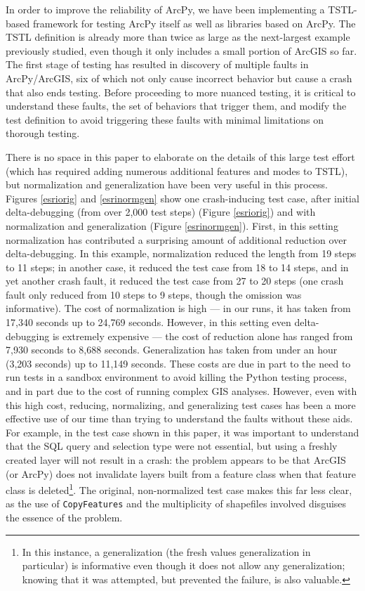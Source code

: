 In order to improve the reliability of ArcPy, we have been
implementing a TSTL-based framework for testing ArcPy itself as well
as libraries based on ArcPy.  The TSTL definition is already more than
twice as large as the next-largest example previously studied, even
though it only includes a small portion of ArcGIS so far. The first
stage of testing has resulted in discovery of multiple faults in
ArcPy/ArcGIS, six of which not only cause incorrect behavior but
cause a crash that also ends testing.  Before proceeding to more
nuanced testing, it is critical to understand these faults, the set of
behaviors that trigger them, and modify the test definition to avoid
triggering these faults with minimal limitations on thorough testing.

There is no space in this paper to elaborate on the details of this
large test effort (which has required adding numerous additional
features and modes to TSTL), but normalization and generalization have
been very useful in this process.  Figures \ref{esriorig} and
\ref{esrinormgen} show one crash-inducing test case, after initial
delta-debugging (from over 2,000 test steps) (Figure \ref{esriorig})
and with normalization and generalization (Figure \ref{esrinormgen}).
First, in this setting normalization has contributed a surprising
amount of additional reduction over delta-debugging.  In this example,
normalization reduced the length from 19 steps to 11 steps; in another
case, it reduced the test case from 18 to 14 steps, and in yet another
crash fault, it reduced the test case from 27 to 20 steps (one crash
fault only reduced from 10 steps to 9 steps, though the omission was
informative).  The cost of normalization is high --- in our runs, it
has taken from 17,340 seconds up to 24,769 seconds.  However, in this
setting even delta-debugging is extremely expensive --- the cost of
reduction alone has ranged from 7,930 seconds to 8,688 seconds.
Generalization has taken from under an hour (3,203 seconds) up to
11,149 seconds.  These costs are due in part to the need to run tests
in a sandbox environment to avoid killing the Python testing process,
and in part due to the cost of running complex GIS analyses.  However,
even with this high cost, reducing, normalizing, and generalizing test
cases has been a more effective use of our time than trying to
understand the faults without these aids.  For example, in the test
case shown in this paper, it was important to understand that the SQL
query and selection type were not essential, but using a freshly
created layer will not result in a crash: the problem appears to be
that ArcGIS (or ArcPy) does not invalidate layers built from a feature
class when that feature class is deleted\footnote{In this instance, a
  generalization (the fresh values generalization in particular) is
  informative even though it does not allow any generalization;
  knowing that it was attempted, but prevented the failure, is also
  valuable.}.  The original, non-normalized test case makes this far
less clear, as the use of {\tt CopyFeatures} and the multiplicity of
shapefiles involved disguises the essence of the problem.

